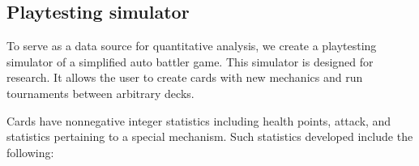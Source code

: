 
\subsection{Playtesting simulator}

To serve as a data source for quantitative analysis, we create
a playtesting simulator of a simplified auto battler game. 
This simulator is designed for research. It allows the user to 
create cards with new mechanics and run tournaments between
arbitrary decks. 

Cards have nonnegative integer statistics including health points, 
attack, and statistics pertaining to a special mechanism. Such statistics
developed include the following:

